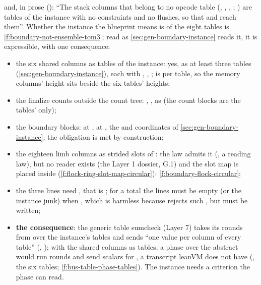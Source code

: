 and, in prose (): \enquote{The stack columns that belong to no opcode table
(, , , ;
) are tables of the instance with no constraints and no flushes, so that
 and  reach them}. Whether the instance the blueprint
means is  of the eight tables is \cref{f:boundary-not-ensemble-tom3}; read as
\cref{sec:gen-boundary-instance} reads it, it is expressible, with one consequence:
\begin{itemize}
\item the six shared columns as tables of the instance: yes, as at least three tables
  (\cref{sec:gen-boundary-instance}), each with , ,
  ;  is per table, so the memory columns' height 
  sits beside the six tables' heights;
\item the finalize counts outside the count tree: , ,
  as  (the count blocks are the tables'  only);
\item the boundary blocks:  at ,
   at , the  and 
  coordinates of \cref{sec:gen-boundary-instance}; the  obligation is met by
  construction;
\item the eighteen limb columns as strided slots of : the  law admits it
  (, a reading law), but no reader exists (the Layer 1 dossier,
   G.1) and the slot map is placed inside 
  (\cref{f:flock-ring-slot-map-circular}): \cref{f:boundary-flock-circular};
\item the three lines need , that is ; for a total
   the lines must be empty (or the instance junk) when ,
  which is harmless because  rejects such , but must be written;
\item \textbf{the consequence}: the generic table sumcheck (Layer 7) takes its rounds from
   over the instance's tables and sends \enquote{one value per column of
  every table} (, ); with the shared columns
  as tables, a phase over the abstract  would run
   rounds and send scalars for
  , a transcript leanVM does not have (, the six
  tables; \cref{f:bus-table-phase-tables}). The instance needs a criterion the phase can read.
\end{itemize}

